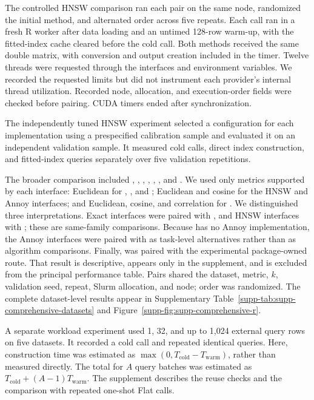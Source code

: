 \documentclass[article]{jss}
\begin{document}
The controlled HNSW comparison ran each pair on the same node, randomized
the initial method, and alternated order across five repeats. Each call ran
in a fresh R worker after data loading and an untimed 128-row warm-up, with
the fitted-index cache cleared before the cold call. Both methods received
the same double matrix, with conversion and output creation included in the
timer. Twelve threads were requested through the interfaces and environment
variables. We recorded the requested limits but did not instrument each
provider's internal thread utilization. Recorded node, allocation, and
execution-order fields were checked before pairing. CUDA timers ended after
synchronization.

The independently tuned HNSW experiment selected a configuration for each
implementation using a prespecified calibration sample and evaluated it on an
independent validation sample. It measured cold calls, direct index
construction, and fitted-index queries separately over five validation
repetitions.

The broader comparison included , , ,
, , , and .
We used only metrics supported by each interface: Euclidean for ,
, and ; Euclidean and cosine for the HNSW and Annoy
interfaces; and Euclidean, cosine, and correlation for .
We distinguished three interpretations. Exact interfaces were paired with
, and HNSW interfaces with ; these are same-family
comparisons. Because  has no Annoy implementation, the Annoy
interfaces were paired with  as task-level
alternatives rather than as algorithm comparisons. Finally,
 was paired with the experimental package-owned
 route. That result is descriptive, appears only in
the supplement, and is excluded from the principal performance table. Pairs
shared the dataset, metric, $k$, validation seed, repeat, Slurm allocation,
and node; order was randomized. The complete dataset-level results appear in
Supplementary Table~\ref{supp-tab:supp-comprehensive-datasets} and
Figure~\ref{supp-fig:supp-comprehensive-r}.

A separate workload experiment used 1, 32, and up to 1,024 external query rows
on five datasets. It recorded a cold call and repeated identical queries.
Here, construction time was estimated as
$\max(0,T_{\mathrm{cold}}-T_{\mathrm{warm}})$, rather than measured directly.
The total for $A$ query batches was estimated as
$T_{\mathrm{cold}}+(A-1)T_{\mathrm{warm}}$. The supplement describes the
reuse checks and the comparison with repeated one-shot Flat calls.
\end{document}
